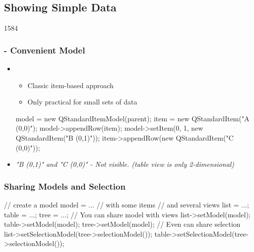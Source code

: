 %
%
%
%

\subsection{Showing Simple Data}


\begin{slide}[fragile]{1584}\frametitle{ -
    Convenient Model}
  \begin{itemize}
  \item {}
    \begin{itemize}
   \item Classic item-based approach
    \item Only practical for small sets of data
 \end{itemize}
   \begin{cpp}
model = new QStandardItemModel(parent);
item = new QStandardItem("A (0,0)");
model->appendRow(item);
model->setItem(0, 1, new QStandardItem("B (0,1)"));
item->appendRow(new QStandardItem("C (0,0)"));
\end{cpp}
\item \textit{"B (0,1)" and "C (0,0)" - Not visible. (table view is only 2-dimensional)}
\end{itemize}
\end{slide}

\begin{slide}[fragile]{}\frametitle{Sharing Models and Selection}
  \begin{cpp}// create a model
model = ... // with some items
// and several views
list = ...; table = ...; tree = ...;
// You can share model with views
list->setModel(model);
table->setModel(model);
tree->setModel(model);
// Even can share selection
list->setSelectionModel(tree->selectionModel());
table->setSelectionModel(tree->selectionModel());
\end{cpp}
\end{slide}

